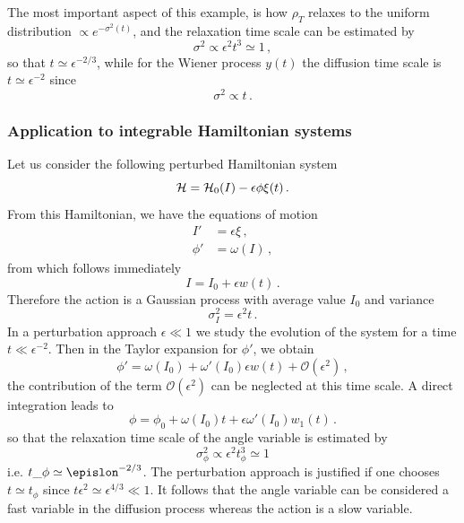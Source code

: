 The most important aspect of this example, is how \(\rho_T\) relaxes to the uniform distribution \(\propto e^{-\sigma^2(t)}\), and the relaxation time scale can be estimated by
\begin{equation}
	\sigma^2 \propto \epsilon^2 t^{3}\simeq 1 \,,
\end{equation}
so that $t\simeq \epsilon^{-2/3}$,
while for the Wiener process $y(t)$ the diffusion time scale is $t\simeq \epsilon^{-2}$ since
\begin{equation}
	\sigma^2 \propto t \,.
\end{equation}

\subsubsection*{Application to integrable Hamiltonian systems}

Let us consider the following perturbed Hamiltonian system
\begin{equation}
	\mathcal{H} = \mathcal{H}_0(I) - \epsilon \phi \xi(t)\,.
\end{equation}
From this Hamiltonian, we have the equations of motion
\begin{equation}
	\begin{aligned}
		{I'} &= \epsilon\xi\,, \\
		{\phi'} &= \omega(I)\,,
	\end{aligned}
\end{equation}
from which follows immediately
\begin{equation}
	I = I_0 + \epsilon w(t)\,.
\end{equation}
Therefore the action is a Gaussian process with average value $I_0$ and variance
\begin{equation}
	\sigma_{I}^2=\epsilon^2t\,.
\end{equation}
In a perturbation approach $\epsilon\ll 1$ we study the evolution of the system for a time $t\ll \epsilon^{-2}$. Then in the  Taylor expansion for \({\phi'}\), we obtain
\begin{equation}
	{\phi'} = \omega(I_0) + \omega'(I_0)\epsilon w(t) + \mathcal{O}(\epsilon^2)\,,
\end{equation}
the contribution of the term $\mathcal{O}(\epsilon^2)$ can be neglected at this time scale. A direct integration leads to
\begin{equation}
	\phi = \phi_0 + \omega(I_0)t + \epsilon \omega'(I_0) w_1(t)\,.
\end{equation}
so that the relaxation time scale of the angle variable is estimated by
\begin{equation}
	\sigma_{\phi}^2 \propto \epsilon^2 t_\phi^3\simeq 1
\end{equation}
i.e. $t\_\phi\simeq \epislon^{-2/3}$. The perturbation approach is justified if one chooses $t\simeq t_\phi$ since $t\epsilon^2\simeq \epsilon^{4/3}\ll 1$. It follows that the angle variable can be considered a fast variable in the diffusion process whereas the action is a slow variable.


